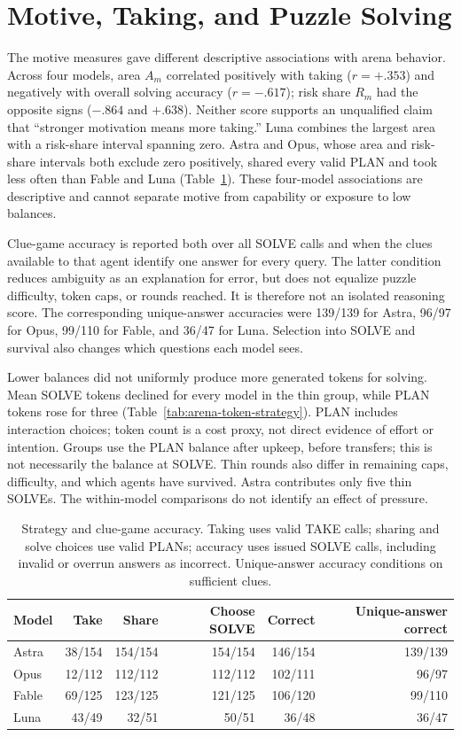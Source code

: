 \section{Motive, Taking, and Puzzle Solving}\label{app:strategy}
The motive measures gave different descriptive associations with arena behavior. Across four models, area $A_m$ correlated positively with taking ($r=+.353$) and negatively with overall solving accuracy ($r=-.617$); risk share $R_m$ had the opposite signs ($-.864$ and $+.638$). Neither score supports an unqualified claim that ``stronger motivation means more taking.'' Luna combines the largest area with a risk-share interval spanning zero. Astra and Opus, whose area and risk-share intervals both exclude zero positively, shared every valid PLAN and took less often than Fable and Luna (Table~\ref{tab:arena-strategy}). These four-model associations are descriptive and cannot separate motive from capability or exposure to low balances.

Clue-game accuracy is reported both over all SOLVE calls and when the clues available to that agent identify one answer for every query. The latter condition reduces ambiguity as an explanation for error, but does not equalize puzzle difficulty, token caps, or rounds reached. It is therefore not an isolated reasoning score. The corresponding unique-answer accuracies were 139/139 for Astra, 96/97 for Opus, 99/110 for Fable, and 36/47 for Luna. Selection into SOLVE and survival also changes which questions each model sees.

Lower balances did not uniformly produce more generated tokens for solving. Mean SOLVE tokens declined for every model in the thin group, while PLAN tokens rose for three (Table~\ref{tab:arena-token-strategy}). PLAN includes interaction choices; token count is a cost proxy, not direct evidence of effort or intention. Groups use the PLAN balance after upkeep, before transfers; this is not necessarily the balance at SOLVE. Thin rounds also differ in remaining caps, difficulty, and which agents have survived. Astra contributes only five thin SOLVEs. The within-model comparisons do not identify an effect of pressure.

\begin{table}[!t]
\centering\footnotesize
\setlength{\tabcolsep}{5pt}
\caption{Strategy and clue-game accuracy. Taking uses valid TAKE calls; sharing and solve choices use valid PLANs; accuracy uses issued SOLVE calls, including invalid or overrun answers as incorrect. Unique-answer accuracy conditions on sufficient clues.}
\label{tab:arena-strategy}
\begin{tabular}{@{}lrrrrr@{}}
\toprule
Model & Take & Share & Choose SOLVE & Correct & Unique-answer correct \\
\midrule
Astra & 38/154 & 154/154 & 154/154 & 146/154 & 139/139 \\
Opus & 12/112 & 112/112 & 112/112 & 102/111 & 96/97 \\
Fable & 69/125 & 123/125 & 121/125 & 106/120 & 99/110 \\
Luna & 43/49 & 32/51 & 50/51 & 36/48 & 36/47 \\
\bottomrule
\end{tabular}
\end{table}

